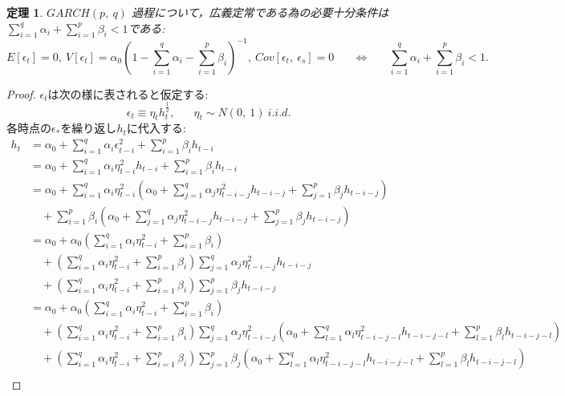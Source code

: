 \documentclass[8pt]{jsarticle}
\newtheorem{prop}{定理}
\newtheorem{proof}{証明}
\begin{document}
\begin{boxnote}
	\begin{prop}
	$GARCH(p,\ q)$ 過程について，広義定常である為の必要十分条件は$\sum_{i=1}^{q} \alpha_i + \sum_{i=1}^{p} \beta_i < 1$である:
	\[
		E[\epsilon_t]=0,\ V[\epsilon_t]=\alpha_0 \left( 1 - \sum_{i=1}^{q} \alpha_i - \sum_{i=1}^{p} \beta_i \right)^{-1},\ Cov[\epsilon_t,\ \epsilon_s]=0
		\hspace{20pt} \Leftrightarrow \hspace{20pt}
		\sum_{i=1}^{q} \alpha_i + \sum_{i=1}^{p} \beta_i < 1.
	\]
	\end{prop}
\end{boxnote}
\begin{proof}
$\epsilon_t$は次の様に表されると仮定する:
\[
	\epsilon_t \equiv \eta_t h_t^{\frac{1}{2}}, \hspace{20pt} \eta_t \sim N(0,\ 1)\ i.i.d.
\]
各時点の$\epsilon_*$を繰り返し$h_t$に代入する:
\begin{align*}
	h_t &= \alpha_0 + \sum_{i=1}^{q} \alpha_i \epsilon_{t-i}^2 + \sum_{i=1}^{p} \beta_i h_{t-i} \\
	&= \alpha_0 + \sum_{i=1}^{q} \alpha_i \eta_{t-i}^2 h_{t-i} + \sum_{i=1}^{p} \beta_i h_{t-i} \\
	&= \alpha_0 + \sum_{i=1}^{q} \alpha_i \eta_{t-i}^2 \left( \alpha_0 + \sum_{j=1}^{q} \alpha_j \eta_{t-i-j}^2 h_{t-i-j} + \sum_{j=1}^{p} \beta_j h_{t-i-j} \right)\\
		&\quad+ \sum_{i=1}^{p} \beta_i \left( \alpha_0 + \sum_{j=1}^{q} \alpha_j \eta_{t-i-j}^2 h_{t-i-j} + \sum_{j=1}^{p} \beta_j h_{t-i-j} \right) \\
	&= \alpha_0 + \alpha_0 \left( \sum_{i=1}^{q} \alpha_i \eta_{t-i}^2 + \sum_{i=1}^{p} \beta_i \right) \\
		&\quad+ \left( \sum_{i=1}^{q} \alpha_i \eta_{t-i}^2 + \sum_{i=1}^{p} \beta_i \right) \sum_{j=1}^{q} \alpha_j \eta_{t-i-j}^2 h_{t-i-j} \\
		&\quad+ \left( \sum_{i=1}^{q} \alpha_i \eta_{t-i}^2 + \sum_{i=1}^{p} \beta_i \right) \sum_{j=1}^{p} \beta_j h_{t-i-j} \\
	&= \alpha_0 + \alpha_0 \left( \sum_{i=1}^{q} \alpha_i \eta_{t-i}^2 + \sum_{i=1}^{p} \beta_i \right) \\
		&\quad+ \left( \sum_{i=1}^{q} \alpha_i \eta_{t-i}^2 + \sum_{i=1}^{p} \beta_i \right) \sum_{j=1}^{q} \alpha_j \eta_{t-i-j}^2 \left( \alpha_0 + \sum_{l=1}^{q} \alpha_l \eta_{t-i-j-l}^2 h_{t-i-j-l} + \sum_{l=1}^{p} \beta_l h_{t-i-j-l} \right) \\
		&\quad+ \left( \sum_{i=1}^{q} \alpha_i \eta_{t-i}^2 + \sum_{i=1}^{p} \beta_i \right) \sum_{j=1}^{p} \beta_j \left( \alpha_0 + \sum_{l=1}^{q} \alpha_l \eta_{t-i-j-l}^2 h_{t-i-j-l} + \sum_{l=1}^{p} \beta_l h_{t-i-j-l} \right) \\

\end{align*}
\end{proof}
\end{document}
